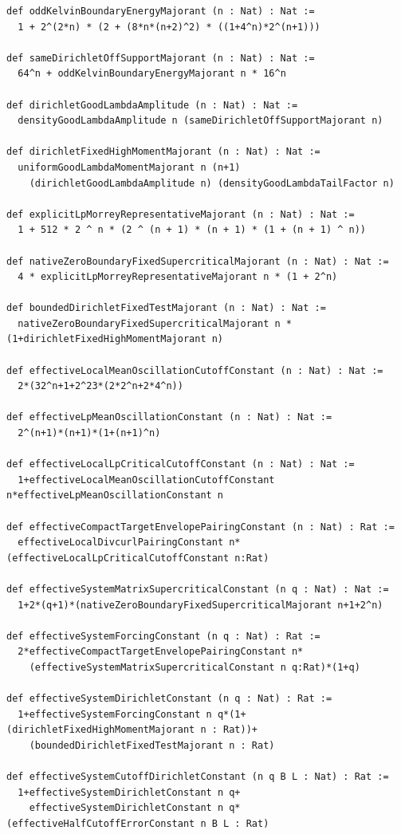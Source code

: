 \documentclass[reqno,11pt]{amsart}
\numberwithin{equation}{section}
\theoremstyle{definition}
\theoremstyle{remark}
\begin{document}
\begin{lstlisting}
def oddKelvinBoundaryEnergyMajorant (n : Nat) : Nat :=
  1 + 2^(2*n) * (2 + (8*n*(n+2)^2) * ((1+4^n)*2^(n+1)))

def sameDirichletOffSupportMajorant (n : Nat) : Nat :=
  64^n + oddKelvinBoundaryEnergyMajorant n * 16^n

def dirichletGoodLambdaAmplitude (n : Nat) : Nat :=
  densityGoodLambdaAmplitude n (sameDirichletOffSupportMajorant n)

def dirichletFixedHighMomentMajorant (n : Nat) : Nat :=
  uniformGoodLambdaMomentMajorant n (n+1)
    (dirichletGoodLambdaAmplitude n) (densityGoodLambdaTailFactor n)

def explicitLpMorreyRepresentativeMajorant (n : Nat) : Nat :=
  1 + 512 * 2 ^ n * (2 ^ (n + 1) * (n + 1) * (1 + (n + 1) ^ n))

def nativeZeroBoundaryFixedSupercriticalMajorant (n : Nat) : Nat :=
  4 * explicitLpMorreyRepresentativeMajorant n * (1 + 2^n)

def boundedDirichletFixedTestMajorant (n : Nat) : Nat :=
  nativeZeroBoundaryFixedSupercriticalMajorant n * (1+dirichletFixedHighMomentMajorant n)

def effectiveLocalMeanOscillationCutoffConstant (n : Nat) : Nat :=
  2*(32^n+1+2^23*(2*2^n+2*4^n))

def effectiveLpMeanOscillationConstant (n : Nat) : Nat :=
  2^(n+1)*(n+1)*(1+(n+1)^n)

def effectiveLocalLpCriticalCutoffConstant (n : Nat) : Nat :=
  1+effectiveLocalMeanOscillationCutoffConstant n*effectiveLpMeanOscillationConstant n

def effectiveCompactTargetEnvelopePairingConstant (n : Nat) : Rat :=
  effectiveLocalDivcurlPairingConstant n*(effectiveLocalLpCriticalCutoffConstant n:Rat)

def effectiveSystemMatrixSupercriticalConstant (n q : Nat) : Nat :=
  1+2*(q+1)*(nativeZeroBoundaryFixedSupercriticalMajorant n+1+2^n)

def effectiveSystemForcingConstant (n q : Nat) : Rat :=
  2*effectiveCompactTargetEnvelopePairingConstant n*
    (effectiveSystemMatrixSupercriticalConstant n q:Rat)*(1+q)

def effectiveSystemDirichletConstant (n q : Nat) : Rat :=
  1+effectiveSystemForcingConstant n q*(1+(dirichletFixedHighMomentMajorant n : Rat))+
    (boundedDirichletFixedTestMajorant n : Rat)

def effectiveSystemCutoffDirichletConstant (n q B L : Nat) : Rat :=
  1+effectiveSystemDirichletConstant n q+
    effectiveSystemDirichletConstant n q*(effectiveHalfCutoffErrorConstant n B L : Rat)


\end{lstlisting}
\end{document}
